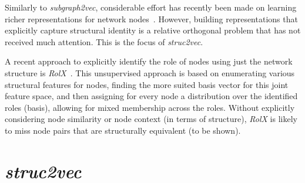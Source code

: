 \documentclass[sigconf]{acmart}
\begin{document}
Similarly to \textit{subgraph2vec}, considerable effort has recently been made on learning richer representations for network nodes~\cite{structural,dnnreps}. However, building representations that explicitly capture structural identity is a relative orthogonal problem that has not received much attention. This is the focus of \textit{struc2vec}.



A recent approach to explicitly identify the role of nodes using just the network structure is \textit{RolX}~\cite{henderson2012rolx}. This unsupervised approach is based on enumerating various structural features for nodes, finding the more suited basis vector for this joint feature space, and then assigning for every node a distribution over the identified roles (basis), allowing for mixed membership across the roles. Without explicitly considering node similarity or node context (in terms of structure), \textit{RolX} is likely to miss node pairs that are structurally equivalent (to be shown).

 \section{\textit{struc2vec}} \label{sec:struc2vec}
\label{sec:struct2vec}
\end{document}
